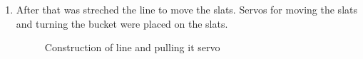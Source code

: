 \begin{enumerate}
  \item After that was streched the line to move the slats. Servos for moving the slats and turning the bucket were placed on the slats.
  \begin{figure}[H]
  	\begin{minipage}[h]{0.47\linewidth}
  		\caption{Construction of line and pulling it servo}
  	\end{minipage}
  	\hfill
  	\begin{minipage}[h]{0.47\linewidth}

\end{minipage}
\end{figure}
\end{enumerate}
